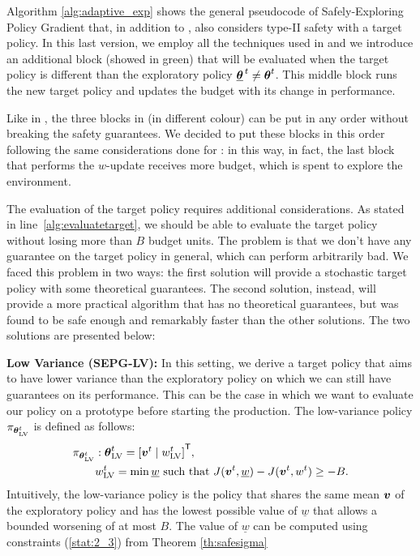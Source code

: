 Algorithm \ref{alg:adaptive_exp} shows the general pseudocode of Safely-Exploring Policy Gradient that, in addition to , also considers type-II safety with a target policy. In this last version, we employ all the techniques used in  and we introduce an additional block (showed in green) that will be evaluated when the target policy is different than the exploratory policy ${\underline{{\boldsymbol{\theta}}}^{\,t}} \neq {\boldsymbol{\theta}}^t$. This middle block runs the new target policy and updates the budget with its change in performance.

\begin{note}
Like in , the three blocks in  (in different colour) can be put in any order without breaking the safety guarantees. We decided to put these blocks in this order following the same considerations done for : in this way, in fact, the last block that performs the $w$-update receives more budget, which is spent to explore the environment.
\end{note}

The evaluation of the target policy requires additional considerations. As stated in line~\ref{alg:evaluatetarget}, we should be able to evaluate the target policy without losing more than $B$ budget units. The problem is that we don't have any guarantee on the target policy in general, which can perform arbitrarily bad. We faced this problem in two ways: the first solution will provide a stochastic target policy with some theoretical guarantees. The second solution, instead, will provide a more practical algorithm that has no theoretical guarantees, but was found to be safe enough and remarkably faster than the other solutions. The two solutions are presented below:

\textbf{Low Variance (SEPG-LV):} In this setting, we derive a target policy that aims to have lower variance than the exploratory policy on which we can still have guarantees on its performance. This can be the case in which we want to evaluate our policy on a prototype before starting the production. The low-variance policy $\pi_{{\boldsymbol{\theta}}^t_{\text{LV}}}$ is defined as follows:
\begin{align*}
\pi_{{\boldsymbol{\theta}}^t_{\text{LV}}} &: {\boldsymbol{\theta}}^t_{\text{LV}} = {[\boldsymbol{v}^t \mid w^t_{\text{LV}}]}^{\mathsf{T}}, \\
&w^t_{\text{LV}} = \min {\underline{w}} \text{ such that } J(\boldsymbol{v}^t, \underline{w}) - J(\boldsymbol{v}^t, w^t) \geq -B .
\end{align*}
Intuitively, the low-variance policy is the policy that shares the same mean $\boldsymbol{v}$ of the exploratory policy and has the lowest possible value of $\underline{w}$ that allows a bounded worsening of at most $B$. The value of $\underline{w}$ can be computed using constraints (\ref{stat:2_3}) from Theorem \ref{th:safesigma}

